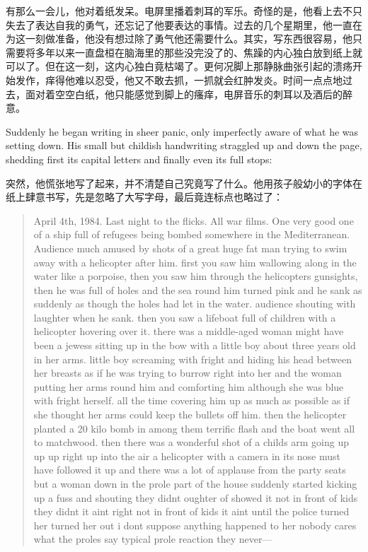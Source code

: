 \begin{paracol}{2}
\switchcolumn

有那么一会儿，他对着纸发呆。电屏里播着刺耳的军乐。奇怪的是，他看上去不只失去了表达自我的勇气，还忘记了他要表达的事情。过去的几个星期里，他一直在为这一刻做准备，他没有想过除了勇气他还需要什么。其实，写东西很容易，他只需要将多年以来一直盘桓在脑海里的那些没完没了的、焦躁的内心独白放到纸上就可以了。但在这一刻，这内心独白竟枯竭了。更何况脚上那静脉曲张引起的溃疡开始发作，痒得他难以忍受，他又不敢去抓，一抓就会红肿发炎。时间一点点地过去，面对着空空白纸，他只能感觉到脚上的瘙痒，电屏音乐的刺耳以及酒后的醉意。

\switchcolumn*

Suddenly he began writing in sheer panic, only imperfectly aware of what
he was setting down. His small but childish handwriting straggled up and
down the page, shedding first its capital letters and finally even its
full stops:

\switchcolumn

突然，他慌张地写了起来，并不清楚自己究竟写了什么。他用孩子般幼小的字体在纸上肆意书写，先是忽略了大写字母，最后竟连标点也略过了：

\switchcolumn*

\begin{quotation}
April 4th, 1984. Last night to the flicks. All war films. One very
good one of a ship full of refugees being bombed somewhere in the
Mediterranean. Audience much amused by shots of a great huge fat man
trying to swim away with a helicopter after him. first you saw him
wallowing along in the water like a porpoise, then you saw him through
the helicopters gunsights, then he was full of holes and the sea round
him turned pink and he sank as suddenly as though the holes had let in
the water. audience shouting with laughter when he sank. then you saw a
lifeboat full of children with a helicopter hovering over it. there was
a middle-aged woman might have been a jewess sitting up in the bow with
a little boy about three years old in her arms. little boy screaming
with fright and hiding his head between her breasts as if he was trying
to burrow right into her and the woman putting her arms round him and
comforting him although she was blue with fright herself. all the time
covering him up as much as possible as if she thought her arms could
keep the bullets off him. then the helicopter planted a 20 kilo bomb in
among them terrific flash and the boat went all to matchwood. then there
was a wonderful shot of a childs arm going up up up right up into the
air a helicopter with a camera in its nose must have followed it up and
there was a lot of applause from the party seats but a woman down in the
prole part of the house suddenly started kicking up a fuss and shouting
they didnt oughter of showed it not in front of kids they didnt it aint
right not in front of kids it aint until the police turned her turned
her out i dont suppose anything happened to her nobody cares what the
proles say typical prole reaction they never---
\end{quotation}


\end{paracol}

